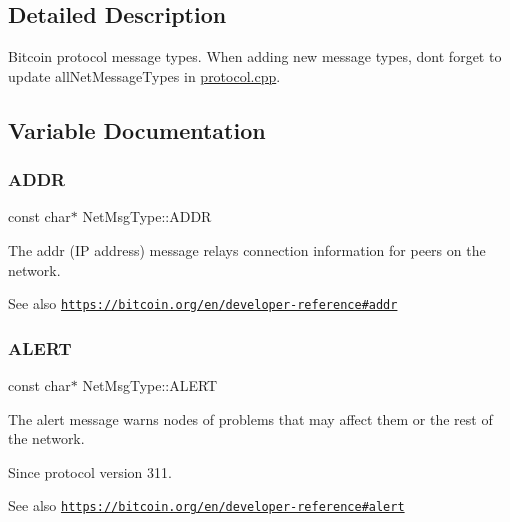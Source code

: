 \subsection{Detailed Description}
Bitcoin protocol message types. When adding new message types, don\textquotesingle{}t forget to update all\+Net\+Message\+Types in \mbox{\hyperlink{protocol_8cpp}{protocol.\+cpp}}. 

\subsection{Variable Documentation}
\mbox{\label{namespace_net_msg_type_a6c096a13b94d05f4188e556f3d1bcfb0}} 
\subsubsection{\texorpdfstring{A\+D\+DR}{ADDR}}
{\footnotesize\ttfamily const char$\ast$ Net\+Msg\+Type\+::\+A\+D\+DR}

The addr (IP address) message relays connection information for peers on the network. \begin{DoxySeeAlso}{See also}
\href{https://bitcoin.org/en/developer-reference#addr}{\tt https\+://bitcoin.\+org/en/developer-\/reference\#addr} 
\end{DoxySeeAlso}
\mbox{\label{namespace_net_msg_type_a7842a52c9591fef666bb8b02a2951c79}} 
\subsubsection{\texorpdfstring{A\+L\+E\+RT}{ALERT}}
{\footnotesize\ttfamily const char$\ast$ Net\+Msg\+Type\+::\+A\+L\+E\+RT}

The alert message warns nodes of problems that may affect them or the rest of the network. \begin{DoxySince}{Since}
protocol version 311. 
\end{DoxySince}
\begin{DoxySeeAlso}{See also}
\href{https://bitcoin.org/en/developer-reference#alert}{\tt https\+://bitcoin.\+org/en/developer-\/reference\#alert} 
\end{DoxySeeAlso}
\mbox{\label{namespace_net_msg_type_a1213f0378ce77802306a8a71837782b5}} 
